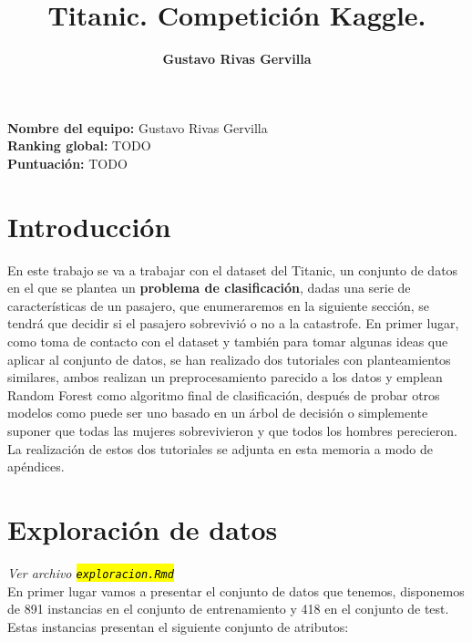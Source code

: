 \documentclass[10pt,a4paper]{article}
\author{\textbf{Gustavo Rivas Gervilla}}
\title{\textcolor{deepblue}{\textbf{Titanic. Competición Kaggle.}}}
\date{}
\newcommand{\archive}[1]{\sethlcolor{light-blue}\hl{\texttt{#1}}} %
\begin{document}
\maketitle

\begin{center}
  \textbf{Nombre del equipo: }Gustavo Rivas Gervilla\\
  \textbf{Ranking global: }TODO\\
  \textbf{Puntuación: }TODO
\end{center}

\newpage

\tableofcontents

\newpage

\section{Introducción}

En este trabajo se va a trabajar con el dataset del Titanic, un conjunto de datos en el que se plantea un \textbf{problema de clasificación}, dadas una serie de características de un pasajero, que enumeraremos en la siguiente sección, se tendrá que decidir si el pasajero sobrevivió o no a la catastrofe. En primer lugar, como toma de contacto con el dataset y también para tomar algunas ideas que aplicar al conjunto de datos, se han realizado dos tutoriales con planteamientos similares, ambos realizan un preprocesamiento parecido a los datos y emplean Random Forest como algoritmo final de clasificación, después de probar otros modelos como puede ser uno basado en un árbol de decisión o simplemente suponer que todas las mujeres sobrevivieron y que todos los hombres perecieron. La realización de estos dos tutoriales se adjunta en esta memoria a modo de apéndices.\\

\section{Exploración de datos} \emph{Ver archivo \archive{exploracion.Rmd}}\\

En primer lugar vamos a presentar el conjunto de datos que tenemos, disponemos de 891 instancias en el conjunto de entrenamiento y 418 en el conjunto de test. Estas instancias presentan el siguiente conjunto de atributos:
\end{document}
